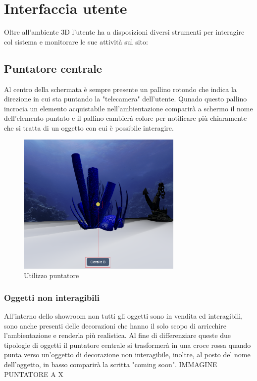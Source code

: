 \section{Interfaccia utente}
Oltre all'ambiente 3D l'utente ha a disposizioni diversi strumenti per interagire col sistema e monitorare le sue attività sul sito:
\subsection{Puntatore centrale}
Al centro della schermata è sempre presente un pallino rotondo che indica la direzione in cui sta puntando la "telecamera" dell'utente. Qunado questo pallino incrocia un elemento acquistabile nell'ambientazione comparirà a schermo il nome dell'elemento puntato e il pallino cambierà colore per notificare più chiaramente che si tratta di un oggetto con cui è possibile interagire.
\begin{figure}
  \renewcommand{\thefigure}{1}
\begin{center}
  \includegraphics[width=8cm]{./res/images/puntatore.png}
 \end{center}
 \caption{Utilizzo puntatore}
  \label{Utilizzo puntatore}
\end{figure}

\subsubsection{Oggetti non interagibili}
All'interno dello showroom non tutti gli oggetti sono in vendita ed interagibili, sono anche presenti delle decorazioni che hanno il solo scopo di arricchire l'ambientazione e renderla più realistica.
Al fine di differenziare queste due tipologie di oggetti il puntatore centrale si trasformerà in una croce rossa quando punta verso un'oggetto di decorazione non interagibile, inoltre, al posto del nome dell'oggetto, in basso comparirà la scritta "coming soon".
IMMAGINE PUNTATORE A X

